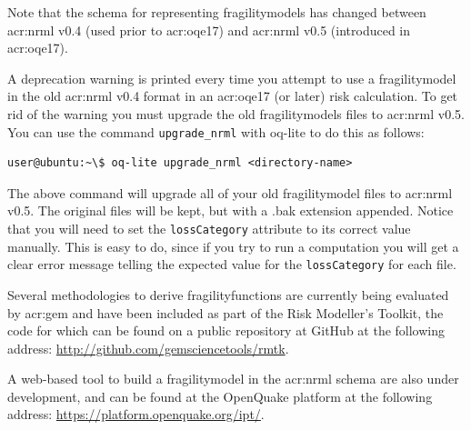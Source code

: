 Note that the schema for representing \glspl{fragilitymodel} has changed
between \gls{acr:nrml} v0.4 (used prior to \gls{acr:oqe17}) and \gls{acr:nrml}
v0.5 (introduced in \gls{acr:oqe17}).

A deprecation warning is printed every time you attempt to use a
\gls{fragilitymodel} in the old \gls{acr:nrml} v0.4 format in an
\gls{acr:oqe17} (or later) risk calculation. To get rid of the warning you
must upgrade the old \glspl{fragilitymodel} files to \gls{acr:nrml} v0.5. You
can use the command \Verb+upgrade_nrml+ with oq-lite to do this as follows:

\begin{verbatim}
user@ubuntu:~\$ oq-lite upgrade_nrml <directory-name>
\end{verbatim}

The above command will upgrade all of your old \gls{fragilitymodel} files to
\gls{acr:nrml} v0.5. The original files will be kept, but with a .bak extension
appended. Notice that you will need to set the \Verb+lossCategory+ attribute
to its correct value manually. This is easy to do, since if you try to run a
computation you will get a clear error message telling the expected value for
the \Verb+lossCategory+ for each file.


Several methodologies to derive \glspl{fragilityfunction} are currently being
evaluated by \gls{acr:gem} and have been included as part of the Risk
Modeller's Toolkit, the code for which can be found on a public repository at
GitHub at the following address: 
\href{http://github.com/gemsciencetools/rmtk}{http://github.com/gemsciencetools/rmtk}.

A web-based tool to build a \gls{fragilitymodel} in the \gls{acr:nrml} schema
are also under development, and can be found at the OpenQuake platform at the
following address: \href{https://platform.openquake.org/ipt/}{https://platform.openquake.org/ipt/}.